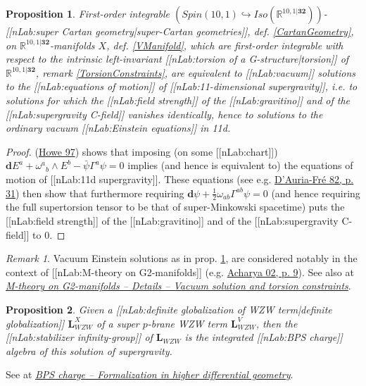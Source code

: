 \documentclass[12pt,titlepage]{article}
\theoremstyle{plain}
\newtheorem{prop}{Proposition}
\theoremstyle{definition}
\theoremstyle{remark}
\newtheorem{remark}{Remark}
\begin{document}
\begin{prop}
\label{VacuumSolutionsIn11d}\hypertarget{VacuumSolutionsIn11d}{}
First-order integrable $(Spin(10,1)\hookrightarrow Iso(\mathbb{R}^{10,1\vert \mathbf{32}}))$-[[nLab:super Cartan geometry|super-Cartan geometries]], def. \ref{CartanGeometry}, on $\mathbb{R}^{10,1\vert\mathbf{32}}$-manifolds $X$, def. \ref{VManifold}, which are first-order integrable with respect to the intrinsic left-invariant [[nLab:torsion of a G-structure|torsion]] of $\mathbb{R}^{10,1\vert \mathbf{32}}$, remark \ref{TorsionConstraints}, are equivalent to [[nLab:vacuum]] solutions to the [[nLab:equations of motion]] of [[nLab:11-dimensional supergravity]], i.e. to solutions for which the [[nLab:field strength]] of the [[nLab:gravitino]] and of the [[nLab:supergravity C-field]] vanishes identically, hence to solutions to the ordinary vacuum [[nLab:Einstein equations]] in 11d.

\end{prop}
\begin{proof}
(\href{http://ncatlab.org/nlab/show/torsion+constraints+in+supergravity#Howe97}{Howe 97}) shows that imposing (on some [[nLab:chart]]) $\mathbf{d} E^a + \omega^{a}{}_b \wedge E^b - \bar \psi \Gamma^a \psi  = 0$ implies (and hence is equivalent to) the equations of motion of [[nLab:11d supergravity]]. These equations (see e.g. \href{http://ncatlab.org/nlab/show/11-dimensional%20supergravity#DAuriaFre}{D'Auria-Fré 82, p. 31}) then show that furthermore requiring $\mathbf{d} \psi + \tfrac{1}{2}\omega_{a b} \Gamma^{a b}\psi = 0$ (and hence requiring the full supertorsion tensor to be that of super-Minkowski spacetime) puts the [[nLab:field strength]] of the [[nLab:gravitino]] and of the [[nLab:supergravity C-field]] to 0.

\end{proof}
\begin{remark}
\label{}\hypertarget{}{}
Vacuum Einstein solutions as in prop. \ref{VacuumSolutionsIn11d}, are considered notably in the context of [[nLab:M-theory on G2-manifolds]] (e.g. \href{http://ncatlab.org/nlab/show/M-theory+on+G2-manifolds#Acharya02}{Acharya 02, p. 9}). See also at \emph{\href{http://ncatlab.org/nlab/show/M-theory+on+G2-manifolds#VacuumSolutionsAndTorsion}{M-theory on G2-manifolds -- Details -- Vacuum solution and torsion constraints}}.

\end{remark}
\begin{prop}
\label{}\hypertarget{}{}
Given a [[nLab:definite globalization of WZW term|definite globalization]] $\mathbf{L}_{WZW}^X$ of a super $p$-brane WZW term $\mathbf{L}_{WZW}^V$, then the [[nLab:stabilizer infinity-group]] of $\mathbf{L}_{WZW}$ is the integrated [[nLab:BPS charge]] algebra of this solution of supergravity.

\end{prop}
See at \emph{\href{http://ncatlab.org/nlab/show/BPS+state#InTermsOfHigherDifferentialGeometry}{BPS charge -- Formalization in higher differential geometry}}.
\end{document}
